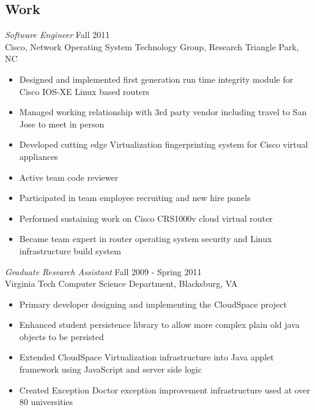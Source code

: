 \documentclass[line,margin]{res}
\begin{document}
\begin{resume}
\section{Work}
        {\sl Software Engineer} \hfill Fall 2011 \\
           Cisco, Network Operating System Technology Group, Research Triangle Park, NC
              \begin{itemize}  \itemsep -2pt %
                 \item Designed and implemented first generation run time integrity
                  module for Cisco IOS-XE Linux based routers
                 \item Managed working relationship with 3rd party vendor including
                   travel to San Jose to meet in person
                 \item Developed cutting edge Virtualization fingerprinting system for
                   Cisco virtual appliances
                 \item Active team code reviewer
                 \item Participated in team employee recruiting and new hire panels
                 \item Performed sustaining work on Cisco CRS1000v cloud virtual router
                 \item Became team expert in router operating system security and
                   Linux infrastructure build system
              \end{itemize}
        {\sl Graduate Research Assistant} \hfill  Fall 2009 - Spring 2011 \\
           Virginia Tech Computer Science Department, Blacksburg, VA
              \begin{itemize} \itemsep -2pt %
                   \item Primary developer designing and implementing the CloudSpace project
                   \item Enhanced student persistence library to allow more
                     complex plain old java objects to be persisted
                   \item Extended CloudSpace Virtualization infrastructure
                     into Java applet framework using JavaScript and server side logic
                   \item Created Exception Doctor exception improvement infrastructure used at over 80 universities
              \end{itemize}

\end{resume}
\end{document}
